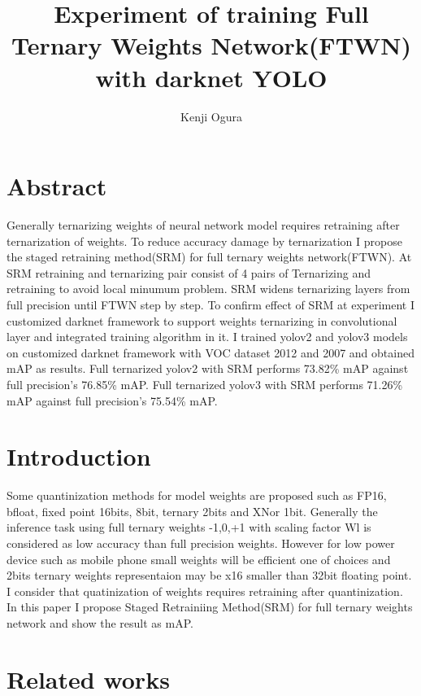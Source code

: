 \documentclass[10pt,a4paper,twocolumn]{article}
\begin{document}
\title{Experiment of training Full Ternary Weights Network(FTWN) with darknet YOLO}
\author{Kenji Ogura}
\date{}
\maketitle

\section{Abstract}
Generally ternarizing weights of neural network model requires retraining after ternarization of weights.
To reduce accuracy damage by ternarization I propose the staged retraining method(SRM) for full ternary weights network(FTWN).
At SRM retraining and ternarizing pair consist of 4 pairs of Ternarizing and retraining to avoid local minumum problem.
SRM widens ternarizing layers from full precision until FTWN step by step.
To confirm effect of SRM at experiment I customized darknet framework to support weights ternarizing in convolutional layer and integrated training algorithm in it.
I trained yolov2 and yolov3 models on customized darknet framework with VOC dataset 2012 and 2007 and obtained mAP as results.
Full ternarized yolov2 with SRM performs 73.82\% mAP against full precision's 76.85\% mAP.
Full ternarized yolov3 with SRM performs 71.26\% mAP against full precision's 75.54\% mAP.

\section{Introduction}

Some quantinization methods for model weights are proposed such as FP16, bfloat, fixed point 16bits, 8bit, ternary 2bits and XNor 1bit.
Generally the inference task using full ternary weights -1,0,+1 with scaling factor Wl is considered as low accuracy than full precision weights.
However for low power device such as mobile phone small weights will be efficient one of choices and 2bits ternary weights representaion may be x16 smaller than 32bit floating point.
I consider that quatinization of weights requires retraining after quantinization.
In this paper I propose Staged Retrainiing Method(SRM) for full ternary weights network and show the result as mAP.

\section{Related works}
\end{document}
